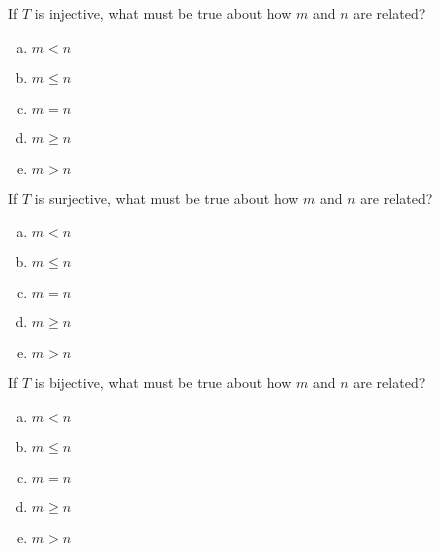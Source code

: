 \begin{applicationActivities}{2}{23}
\begin{activity}{0}
If $T$ is injective, what must be true about how $m$ and $n$ are related?
\begin{enumerate}[(a)]
\item $m<n$
\item $m \leq n$
\item $m=n$
\item $m \geq n$
\item $m>n$
\end{enumerate}
\end{activity}

\begin{activity}{0}
If $T$ is surjective, what must be true about how $m$ and $n$ are related?
\begin{enumerate}[(a)]
\item $m<n$
\item $m \leq n$
\item $m=n$
\item $m \geq n$
\item $m>n$
\end{enumerate}
\end{activity}

\begin{activity}{0}
  If $T$ is bijective, what must be true about how $m$ and $n$ are related?
\begin{enumerate}[(a)]
\item $m<n$
\item $m \leq n$
\item $m=n$
\item $m \geq n$
\item $m>n$
\end{enumerate}
\end{activity}

\end{applicationActivities}
